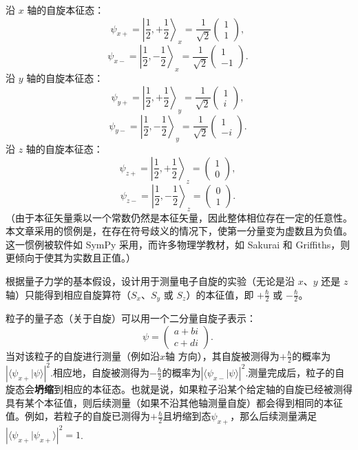 沿 \( x \) 轴的自旋本征态： 
  \[
  \psi_{x+} = \left| \frac{1}{2}, +\frac{1}{2} \right\rangle_x = \frac{1}{\sqrt{2}} \begin{pmatrix} 1 \\ 1 \end{pmatrix},~
  \]
  \[
  \psi_{x-} = \left| \frac{1}{2}, -\frac{1}{2} \right\rangle_x = \frac{1}{\sqrt{2}} \begin{pmatrix} 1 \\ -1 \end{pmatrix}.~
  \]
沿 \( y \) 轴的自旋本征态：
  \[
  \psi_{y+} = \left| \frac{1}{2}, +\frac{1}{2} \right\rangle_y = \frac{1}{\sqrt{2}} \begin{pmatrix} 1 \\ i \end{pmatrix},~
  \]
  \[
  \psi_{y-} = \left| \frac{1}{2}, -\frac{1}{2} \right\rangle_y = \frac{1}{\sqrt{2}} \begin{pmatrix} 1 \\ -i \end{pmatrix}.~
  \]
沿 \( z \) 轴的自旋本征态：  
  \[
  \psi_{z+} = \left| \frac{1}{2}, +\frac{1}{2} \right\rangle_z = \begin{pmatrix} 1 \\ 0 \end{pmatrix},~
  \]
  \[
  \psi_{z-} = \left| \frac{1}{2}, -\frac{1}{2} \right\rangle_z = \begin{pmatrix} 0 \\ 1 \end{pmatrix}.~
  \]
（由于本征矢量乘以一个常数仍然是本征矢量，因此整体相位存在一定的任意性。本文章采用的惯例是，在存在符号歧义的情况下，使第一分量变为虚数且为负值。这一惯例被软件如 SymPy 采用，而许多物理学教材，如 Sakurai 和 Griffiths，则更倾向于使其为实数且正值。）

根据量子力学的基本假设，设计用于测量电子自旋的实验（无论是沿 \( x \)、\( y \) 还是 \( z \) 轴）只能得到相应自旋算符（\( S_x \)、\( S_y \) 或 \( S_z \)）的本征值，即 \( +\frac{\hbar}{2} \) 或 \( -\frac{\hbar}{2} \)。  

粒子的量子态（关于自旋）可以用一个二分量自旋子表示：  
\[
\psi = \begin{pmatrix} a+bi \\ c+di \end{pmatrix}.~
\]
当对该粒子的自旋进行测量（例如沿\(x\)轴 方向），其自旋被测得为\( +\frac{\hbar}{2}\)的概率为\(\left| \langle \psi_{x+} | \psi \rangle \right|^2\).相应地，自旋被测得为\( -\frac{\hbar}{2} \)的概率为\(\left| \langle \psi_{x-} | \psi \rangle \right|^2\).测量完成后，粒子的自旋态会\textbf{坍缩}到相应的本征态。也就是说，如果粒子沿某个给定轴的自旋已经被测得具有某个本征值，则后续测量（如果不沿其他轴测量自旋）都会得到相同的本征值。例如，若粒子的自旋已测得为\( +\frac{\hbar}{2}\)且坍缩到态\(\psi_{x+}\)，那么后续测量满足\(\left| \langle \psi_{x+} | \psi_{x+} \rangle \right|^2 = 1\).
